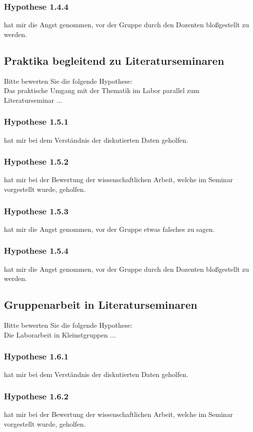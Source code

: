 \subsubsection*{Hypothese 1.4.4}
hat mir die Angst genommen, vor der Gruppe durch den Dozenten bloßgestellt zu werden.


\subsection*{Praktika begleitend zu Literaturseminaren}
Bitte bewerten Sie die folgende Hypothese:\\
\noindent
Das praktische Umgang mit der Thematik im Labor parallel zum Literaturseminar ...
\subsubsection*{Hypothese 1.5.1}
hat mir bei dem Verständnis der diskutierten Daten geholfen.
\subsubsection*{Hypothese 1.5.2}
hat mir bei der Bewertung der wissenschaftlichen Arbeit, welche im Seminar vorgestellt wurde, geholfen.
\subsubsection*{Hypothese 1.5.3}
hat mir die Angst genommen, vor der Gruppe etwas falsches zu sagen.
\subsubsection*{Hypothese 1.5.4}
hat mir die Angst genommen, vor der Gruppe durch den Dozenten bloßgestellt zu werden.


\subsection*{Gruppenarbeit in Literaturseminaren}
Bitte bewerten Sie die folgende Hypothese:\\
\noindent
Die Laborarbeit in Kleinstgruppen ...
\subsubsection*{Hypothese 1.6.1}
hat mir bei dem Verständnis der diskutierten Daten geholfen.
\subsubsection*{Hypothese 1.6.2}
hat mir bei der Bewertung der wissenschaftlichen Arbeit, welche im Seminar vorgestellt wurde, geholfen.
